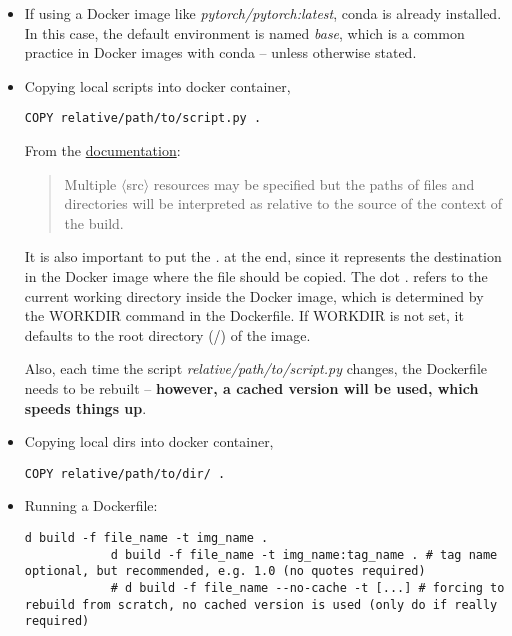 \documentclass[12pt, a4paper]{article}
\numberwithin{equation}{section}
\theoremstyle{definition}
\theoremstyle{definition}
\begin{document}
\begin{itemize}
		\item If using a Docker image like \textit{pytorch/pytorch:latest}, conda is already installed. In this case, the default environment is named \textit{base}, which is a common practice in Docker images with conda -- unless otherwise stated. 
		
		\item Copying local scripts into docker container, 
		
		\begin{lstlisting}[style=mystylebash, label=alg:docker_copy, xleftmargin=\parindent]
			COPY relative/path/to/script.py .
		\end{lstlisting}
		
		From the \href{https://docs.docker.com/engine/reference/builder/#copy}{documentation}:
		
		\begin{quote}
			Multiple $\langle$src$\rangle$ resources may be specified but the paths of files and directories will be interpreted as relative to the source of the context of the build. 
		\end{quote}
		
		It is also important to put the \textit{.} at the end, since it represents the destination in the Docker image where the file should be copied. The dot . refers to the current working directory inside the Docker image, which is determined by the WORKDIR command in the Dockerfile. If WORKDIR is not set, it defaults to the root directory (/) of the image.
		
		Also, each time the script \textit{relative/path/to/script.py} changes, the Dockerfile needs to be rebuilt -- \textbf{however, a cached version will be used, which speeds things up}.
		
		\item Copying local dirs into docker container, 
		
		\begin{lstlisting}[style=mystylebash, label=alg:docker__copy_dir, xleftmargin=\parindent]
			COPY relative/path/to/dir/ .
		\end{lstlisting}
		
		\item Running a Dockerfile:
		
		\begin{lstlisting}[style=mystylebash, label=alg:docker_build, xleftmargin=\parindent]
			d build -f file_name -t img_name .
			d build -f file_name -t img_name:tag_name . # tag name optional, but recommended, e.g. 1.0 (no quotes required)
			# d build -f file_name --no-cache -t [...] # forcing to rebuild from scratch, no cached version is used (only do if really required)
		\end{lstlisting} 
		

\end{itemize}
\end{document}
